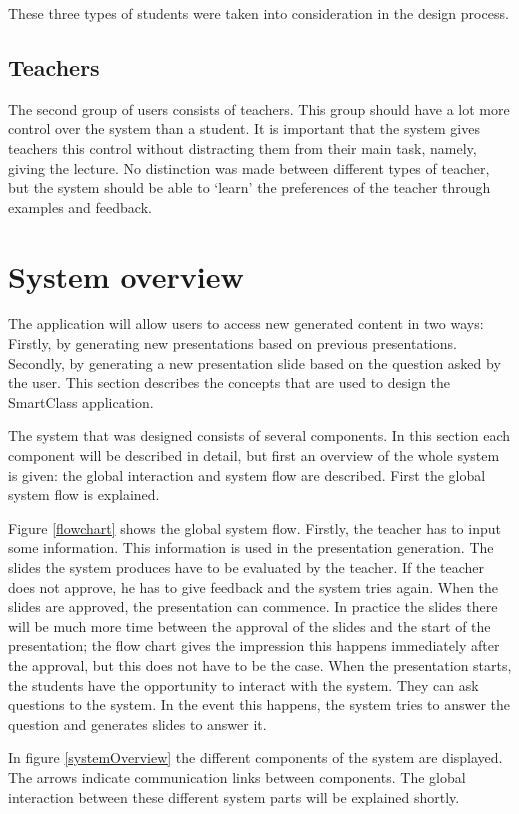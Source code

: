 \documentclass[11pt]{article}
\begin{document}
These three types of students were taken into consideration in the design process.

\subsection{Teachers}
The second group of users consists of teachers. This group should have a lot more control over the system than a student. It is important that the system gives teachers this control without distracting them from their main task, namely, giving the lecture. No distinction was made between different types of teacher, but the system should be able to `learn' the preferences of the teacher through examples and feedback.  

\section{System overview}
The application will allow users to access new generated content in two ways: Firstly, by generating new presentations based on previous presentations. Secondly, by generating a new presentation slide based on the question asked by the user. This section describes the concepts that are used to design the SmartClass application.

The system that was designed consists of several components. In this section each component will be described in detail, but first an overview of the whole system is given: the global interaction and system flow are described. First the global system flow is explained.

Figure \ref{flowchart} shows the global system flow. Firstly, the teacher has to input some information. This information is used in the presentation generation. The slides the system produces have to be evaluated by the teacher. If the teacher does not approve, he has to give feedback and the system tries again.
When the slides are approved, the presentation can commence. In practice the slides there will be much more time between the approval of the slides and the start of the presentation; the flow chart gives the impression this happens immediately after the approval, but this does not have to be the case.
When the presentation starts, the students have the opportunity to interact with the system. They can ask questions to the system. In the event this happens, the system tries to answer the question and generates slides to answer it.

In figure \ref{systemOverview} the different components of the system are displayed. The arrows indicate communication links between components. The global interaction between these different system parts will be explained shortly. 
\end{document}
